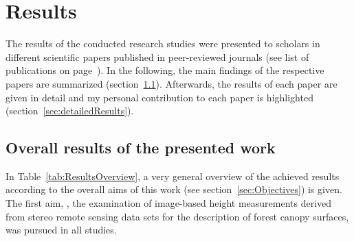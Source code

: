 \chapter{Results}
\label{chp:Results}

The results of the conducted research studies were presented to scholars in different scientific papers 
published in peer-reviewed journals (see list of publications on page~\pageref{chp:Publications}). 
In the following, the main findings of the respective papers are summarized (section~\ref{sec:overallResults}).
Afterwards, the results of each paper are given in detail and my personal contribution to each paper is highlighted (section~\ref{sec:detailedResults}). 

\section{Overall results of the presented work}\label{sec:overallResults}

In Table~\ref{tab:ResultsOverview}, a very general overview of the achieved results according to the overall aims of this work (see section~\ref{sec:Objectives}) is given.
The first aim, \ie, the examination of image-based height measurements derived from stereo remote sensing data sets 
for the description of forest canopy surfaces, was pursued in all studies. 

  

